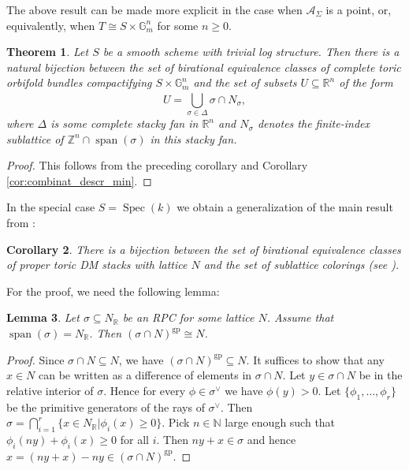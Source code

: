 \documentclass[11pt]{amsart}
\newtheorem{theorem}{Theorem}[section]
\newtheorem{lemma}[theorem]{Lemma}
\newtheorem{corollary}[theorem]{Corollary}
\theoremstyle{definition}
\theoremstyle{remark}
\DeclareMathOperator{\Spec}{Spec}
\DeclareMathOperator{\Span}{span}
\def\gp{\mathrm{gp}}
\begin{document}
The above result can be made more explicit in the case when $\mathcal{A}_{\Sigma}$ is a point, or, equivalently,
when $T\cong S\times \mathbb{G}_{m}^{n}$ for some $n\ge 0$.

\begin{theorem}
	\label{thm:combinat_class_toric_vars}
	Let $S$ be a smooth scheme with trivial log structure. Then there is a natural bijection between the set of birational
	equivalence classes of complete toric orbifold
	bundles compactifying $S\times\mathbb{G}_{m}^{n}$ and the set of subsets $U\subseteq \mathbb{R}^{n}$ of the form
	$$U=\bigcup_{\sigma\in \Delta}^{}\sigma\cap N_{\sigma},$$
	where $\Delta$ is some complete stacky fan in $\mathbb{R}^{n}$ and $N_{\sigma}$ denotes the finite-index sublattice of $\mathbb{Z}^{n}\cap \Span(\sigma)$
	in this stacky fan.
\end{theorem}

\begin{proof}
	This follows from the preceding corollary and Corollary \ref{cor:combinat_descr_min}.
\end{proof}

In the special case $S=\Spec(k)$ we obtain a generalization of the main result from \cite{Schmitt}:

\begin{corollary}
	\label{cor:lattice_colorings}
	There is a bijection between the set of birational equivalence
	classes of proper toric DM stacks with lattice $N$
	and the set of sublattice colorings (see \cite[Definition 4]{Schmitt}).
\end{corollary}

For the proof, we need the following lemma:

\begin{lemma}
	Let $\sigma\subseteq N_{\mathbb{R}}$ be an RPC for some lattice $N$. Assume
	that $\Span(\sigma)=N_{\mathbb{R}}$. Then $(\sigma\cap N)^{\gp}\cong N$.
\end{lemma}

\begin{proof}
	Since $\sigma\cap N\subseteq N$, we have $(\sigma\cap N)^{\gp}\subseteq N$.
	It suffices to show that any $x\in N$ can be written as a difference
	of elements in $\sigma\cap N$. Let $y\in \sigma\cap N$ be in the
	relative interior of $\sigma$. Hence for every $\phi\in \sigma^{\vee}$
	we have $\phi(y)>0$. Let $\{\phi_1,\dots,\phi_r\}$ be the primitive generators
	of the rays of $\sigma^{\vee}$. Then $\sigma=\bigcap_{i=1}^{r}\{x\in N_{\mathbb{R}}|\phi_i(x)\ge 0\}$.
	Pick $n\in \mathbb{N}$ large enough such that $\phi_i(ny)+\phi_i(x)\ge 0$ for all $i$.
	Then $ny+x\in \sigma$ and hence $x=(ny+x)-ny\in (\sigma\cap N)^{\gp}$.
\end{proof}
\end{document}
